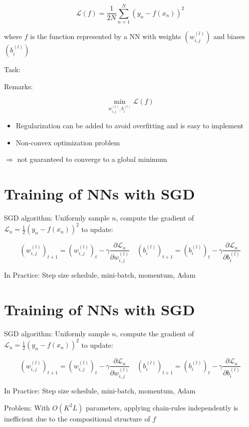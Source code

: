 \documentclass[10pt]{article}
\begin{document}
$$
\mathscr{L}(f)=\frac{1}{2 N} \sum_{n=1}^{N}\left(y_{n}-f\left(x_{n}\right)\right)^{2}
$$

where $f$ is the function represented by a NN with weights $\left(w_{i, j}^{(l)}\right)$ and biases $\left(b_{i}^{(l)}\right)$

Task:

Remarks:

$$
\min _{w_{i, j}^{(l)}, b_{i}^{(l)}} \mathscr{L}(f)
$$

\begin{itemize}
  \item Regularization can be added to avoid overfitting and is easy to implement
  \item Non-convex optimization problem
\end{itemize}

$\Rightarrow$ not guaranteed to converge to a global minimum

\section*{Training of NNs with SGD}
SGD algorithm: Uniformly sample $n$, compute the gradient of $\mathscr{L}_{n}=\frac{1}{2}\left(y_{n}-f\left(x_{n}\right)\right)^{2}$ to update:

$$
\left(w_{i, j}^{(l)}\right)_{t+1}=\left(w_{i, j}^{(l)}\right)_{t}-\gamma \frac{\partial \mathscr{L}_{n}}{\partial w_{i, j}^{(l)}} \quad\left(b_{i}^{(l)}\right)_{t+1}=\left(b_{i}^{(l)}\right)_{t}-\gamma \frac{\partial \mathscr{L}_{n}}{\partial b_{i}^{(l)}}
$$

In Practice: Step size schedule, mini-batch, momentum, Adam

\section*{Training of NNs with SGD}
SGD algorithm: Uniformly sample $n$, compute the gradient of $\mathscr{L}_{n}=\frac{1}{2}\left(y_{n}-f\left(x_{n}\right)\right)^{2}$ to update:

$$
\left(w_{i, j}^{(l)}\right)_{t+1}=\left(w_{i, j}^{(l)}\right)_{t}-\gamma \frac{\partial \mathscr{L}_{n}}{\partial w_{i, j}^{(l)}} \quad\left(b_{i}^{(l)}\right)_{t+1}=\left(b_{i}^{(l)}\right)_{t}-\gamma \frac{\partial \mathscr{L}_{n}}{\partial b_{i}^{(l)}}
$$

In Practice: Step size schedule, mini-batch, momentum, Adam

Problem: With $O\left(K^{2} L\right)$ parameters, applying chain-rules independently is inefficient due to the compositional structure of $f$
\end{document}
